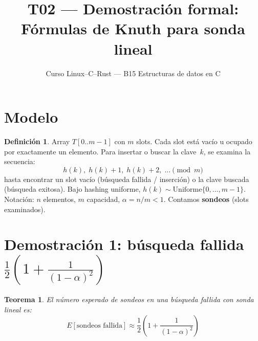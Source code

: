 \documentclass[11pt, letterpaper]{article}
\title{%
  T02 --- Demostración formal:\\[4pt]
  Fórmulas de Knuth para sonda lineal
}
\author{Curso Linux--C--Rust --- B15 Estructuras de datos en C}
\date{}
\theoremstyle{definition}
\newtheorem{definition}{Definición}[section]
\theoremstyle{plain}
\newtheorem{theorem}{Teorema}[section]
\theoremstyle{remark}
\begin{document}
\maketitle
\tableofcontents

\section{Modelo}

\begin{definition}
Array $T[0..m{-}1]$ con $m$ slots. Cada slot está vacío u ocupado por
exactamente un elemento. Para insertar o buscar la clave~$k$, se
examina la secuencia:
\[
  h(k),\; h(k){+}1,\; h(k){+}2,\; \ldots \pmod{m}
\]
hasta encontrar un slot vacío (búsqueda fallida / inserción) o la
clave buscada (búsqueda exitosa). Bajo hashing uniforme,
$h(k) \sim \mathrm{Uniforme}\{0, \ldots, m{-}1\}$.
Notación: $n$ elementos, $m$ capacidad, $\alpha = n/m < 1$.
Contamos \textbf{sondeos} (slots examinados).
\end{definition}

\section{Demostración 1: búsqueda fallida
  \texorpdfstring{$\frac{1}{2}\!\left(1 + \frac{1}{(1-\alpha)^2}\right)$}%
  {1/2(1 + 1/(1-alpha)\^2)}}

\begin{theorem}\label{thm:miss}
El número esperado de sondeos en una búsqueda fallida con sonda lineal
es:
\[
  E[\text{sondeos fallida}]
  \approx \frac{1}{2}\left(1 + \frac{1}{(1-\alpha)^2}\right)
\]
\end{theorem}
\end{document}

